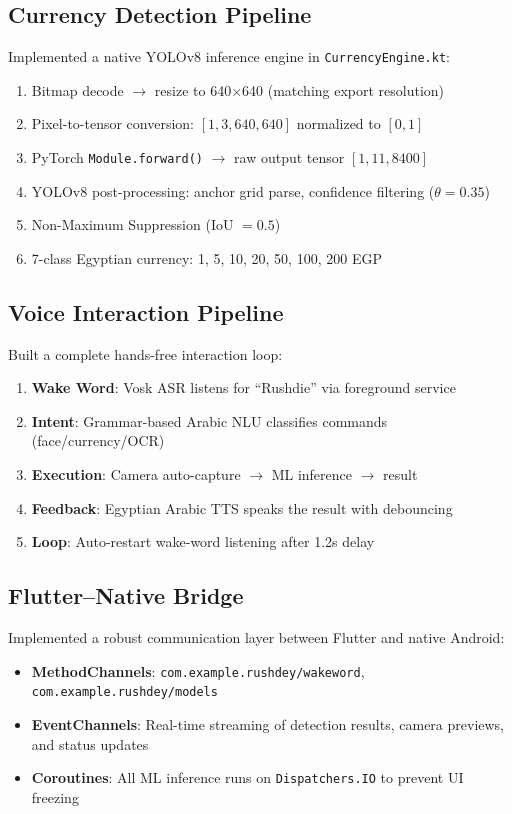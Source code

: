 \documentclass[12pt,a4paper]{article}
\begin{document}
\subsection{Currency Detection Pipeline}
Implemented a native YOLOv8 inference engine in \texttt{CurrencyEngine.kt}:
\begin{enumerate}
  \item Bitmap decode $\rightarrow$ resize to 640$\times$640 (matching export resolution)
  \item Pixel-to-tensor conversion: $[1, 3, 640, 640]$ normalized to $[0, 1]$
  \item PyTorch \texttt{Module.forward()} $\rightarrow$ raw output tensor $[1, 11, 8400]$
  \item YOLOv8 post-processing: anchor grid parse, confidence filtering ($\theta = 0.35$)
  \item Non-Maximum Suppression (IoU $= 0.5$)
  \item 7-class Egyptian currency: 1, 5, 10, 20, 50, 100, 200 EGP
\end{enumerate}

\subsection{Voice Interaction Pipeline}
Built a complete hands-free interaction loop:
\begin{enumerate}
  \item \textbf{Wake Word}: Vosk ASR listens for ``Rushdie'' via foreground service
  \item \textbf{Intent}: Grammar-based Arabic NLU classifies commands (face/currency/OCR)
  \item \textbf{Execution}: Camera auto-capture $\rightarrow$ ML inference $\rightarrow$ result
  \item \textbf{Feedback}: Egyptian Arabic TTS speaks the result with debouncing
  \item \textbf{Loop}: Auto-restart wake-word listening after 1.2s delay
\end{enumerate}

\subsection{Flutter--Native Bridge}
Implemented a robust communication layer between Flutter and native Android:
\begin{itemize}
  \item \textbf{MethodChannels}: \texttt{com.example.rushdey/wakeword}, \texttt{com.example.rushdey/models}
  \item \textbf{EventChannels}: Real-time streaming of detection results, camera previews, and status updates
  \item \textbf{Coroutines}: All ML inference runs on \texttt{Dispatchers.IO} to prevent UI freezing
\end{itemize}
\end{document}
